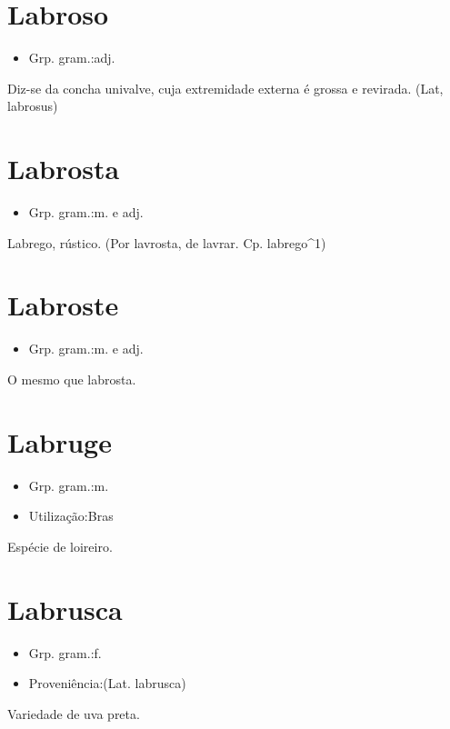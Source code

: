 \section{Labroso}
\begin{itemize}
\item {Grp. gram.:adj.}
\end{itemize}
Diz-se da concha univalve, cuja extremidade externa é grossa e revirada.
(Lat, \textunderscore labrosus\textunderscore )
\section{Labrosta}
\begin{itemize}
\item {Grp. gram.:m.  e  adj.}
\end{itemize}
Labrego, rústico.
(Por \textunderscore lavrosta\textunderscore , de \textunderscore lavrar\textunderscore . Cp. \textunderscore labrego\textunderscore ^1)
\section{Labroste}
\begin{itemize}
\item {Grp. gram.:m.  e  adj.}
\end{itemize}
O mesmo que \textunderscore labrosta\textunderscore .
\section{Labruge}
\begin{itemize}
\item {Grp. gram.:m.}
\end{itemize}
\begin{itemize}
\item {Utilização:Bras}
\end{itemize}
Espécie de loireiro.
\section{Labrusca}
\begin{itemize}
\item {Grp. gram.:f.}
\end{itemize}
\begin{itemize}
\item {Proveniência:(Lat. \textunderscore labrusca\textunderscore )}
\end{itemize}
Variedade de uva preta.

